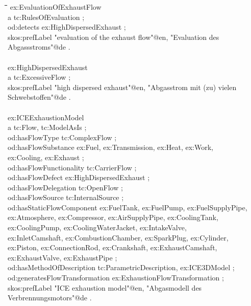 \documentclass[a4paper,11pt]{article}
\newenvironment{code}{\tt \begin{tabbing}
\hskip12pt\=\hskip12pt\=\hskip12pt\=\hskip12pt\=\hskip5cm\=\hskip5cm\=\kill}
{\end{tabbing}}
\begin{document}
    \begin{code}    
    ex:EvaluationOfExhaustFlow \\
    \> a tc:RulesOfEvaluation ; \\
    \> od:detects ex:HighDispersedExhaust ; \\
    \> skos:prefLabel "evaluation of the exhaust flow"@en, "Evaluation des  \\
    \> Abgassstroms"@de . \\
    \\
    ex:HighDispersedExhaust \\
    \> a tc:ExcessiveFlow ; \\
    \> skos:prefLabel "high dispersed exhaust"@en, "Abgasstrom mit (zu) vielen  \\
    \> Schwebstoffen"@de . \\
    \\
    ex:ICEExhaustionModel \\
    \> a tc:Flow, tc:ModelAsIs ; \\
    \> od:hasFlowType tc:ComplexFlow ; \\
    \> od:hasFlowSubstance ex:Fuel, ex:Transmission, ex:Heat, ex:Work,  \\
    \> ex:Cooling, ex:Exhaust ; \\
    \> od:hasFlowFunctionality tc:CarrierFlow ; \\
    \> od:hasFlowDefect ex:HighDispersedExhaust ; \\
    \> od:hasFlowDelegation tc:OpenFlow ; \\
    \> od:hasFlowSource tc:InternalSource ; \\
    \> od:hasStaticFlowComponent ex:FuelTank, ex:FuelPump, ex:FuelSupplyPipe,\\
    \> ex:Atmosphere, ex:Compressor, ex:AirSupplyPipe, ex:CoolingTank, \\
    \> ex:CoolingPump, ex:CoolingWaterJacket, ex:IntakeValve, \\
    \> ex:InletCamshaft, ex:CombustionChamber, ex:SparkPlug, ex:Cylinder, \\
    \> ex:Piston, ex:ConnectionRod, ex:Crankshaft, ex:ExhaustCamshaft, \\
    \> ex:ExhaustValve, ex:ExhaustPipe ; \\
    \> od:hasMethodOfDescription tc:ParametricDescription, ex:ICE3DModel ; \\
    \> od:generatesFlowTransformation ex:ExhaustionFlowTransformation ; \\
    \> skos:prefLabel "ICE exhaustion model"@en, "Abgasmodell des Verbrennungsmotors"@de . \\
    \end{code}
\end{document}
